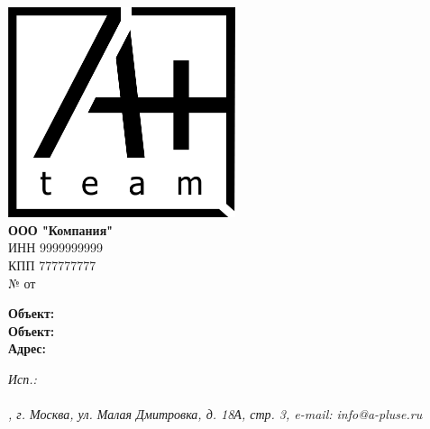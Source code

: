 \documentclass[a4paper,12pt]{letter}
\begin{document}
\noindent
\begin{minipage}[t]{0.5\textwidth}
    \vspace{0pt} %
    \includegraphics[width=0.5\textwidth]{A.png} \\ %
    \textbf{ООО "Компания"} \\
    ИНН 9999999999 \\
    КПП 777777777 \\
    № \textbf{  } от \textbf{  } \\
\end{minipage}%

\begin{minipage}[t]{0.5\textwidth} 
    \textbf{Объект:} \textbf{} \\
    \textbf{Объект:}  \\
    \textbf{Адрес:} 
\end{minipage}%
\begin{minipage}[t]{0.5\textwidth}
    \raggedleft
    \bfseries
    
\end{minipage}

\vspace{1cm}

\begin{center}
    \textbf{  }
\end{center}


\vspace{0.5cm}

\begin{minipage}[t]{\textwidth}
    \raggedright
    

\end{minipage}

\vspace{1cm}


\begin{minipage}[t]{0.4\textwidth}
    \textbf{  }
\end{minipage}%
\begin{minipage}[t]{0.2\textwidth}
    \centering
    \underline{\hspace{5cm}}
\end{minipage}%
\begin{minipage}[t]{0.4\textwidth}
    \raggedleft
    \textbf{  }
\end{minipage}


\vfill

\noindent
\itshape
Исп.:  \\
 \\


\noindent\makebox[\linewidth]{\rule{1\paperwidth}{0.4pt}}
\noindent
\centering
\fontsize{9}{10}, г. Москва, ул. Малая Дмитровка, д. 18А, стр. 3, e-mail: info@a-pluse.ru
\end{document}
